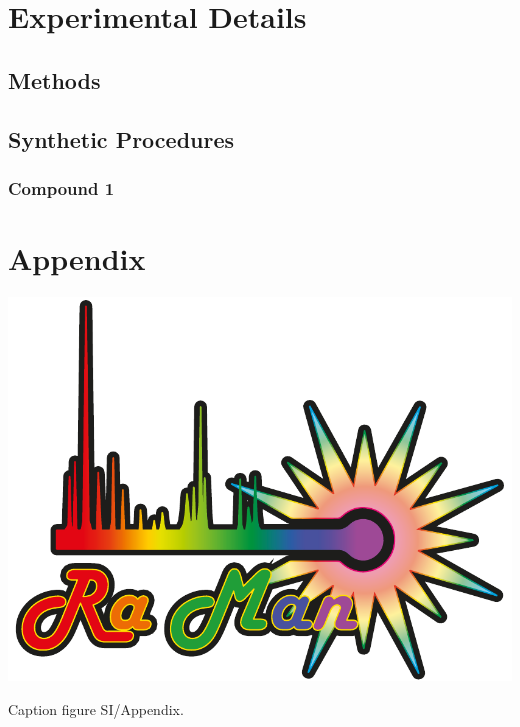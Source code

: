 \documentclass[main_brownies.tex]{subfiles}
\begin{document}

\section*{Experimental Details}
\subsection*{Methods}

\subsection*{Synthetic Procedures}
\subsubsection*{Compound 1}

\clearpage
\newpage

\section*{Appendix}
\vspace*{-\baselineskip} %

\begin{figureSI}[H] %
	\centering
	\includegraphics[width=.65\textwidth]{Figure_S1/Chapter_2_Figure_S1} %
	\caption{Caption figure SI/Appendix.}
	\label{fgr:Figure_S1}
\end{figureSI}
\end{document}
